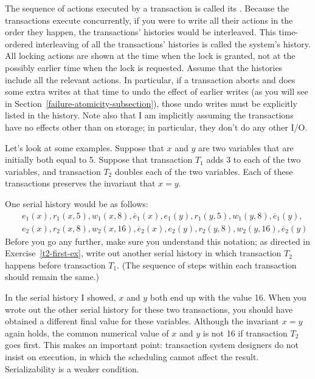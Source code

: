 The sequence of actions executed by a transaction is called its
.
Because the transactions execute concurrently, if you were to write
all their actions in the order they happen, the transactions'
histories would be interleaved.
This time-ordered interleaving of all the
transactions' histories is called the system's history.  All locking actions
are shown at the time when the lock is granted, not at the possibly
earlier time when the lock is requested.  Assume that the histories
include all the relevant actions.  In particular, if a transaction
aborts and does some extra writes at that time to undo the effect of
earlier writes (as you will see in Section~\ref{failure-atomicity-subsection}),
those undo writes must be explicitly listed in the history.  Note
also that I am implicitly assuming the transactions have no effects
other than on storage; in particular, they don't do any other I/O.

Let's look at some examples.  Suppose that $x$ and $y$ are two
variables that are initially both equal to 5.
Suppose that transaction $T_1$ adds 3 to each of the two
variables, and transaction $T_2$ doubles each of the two variables.
Each of these transactions preserves the invariant that
$x=y$.

One serial history would be as follows:
\begin{eqnarray*}
&&e_1(x), r_1(x, 5), w_1(x, 8), \overline{e}_1(x),
  e_1(y), r_1(y, 5), w_1(y, 8), \overline{e}_1(y),\\
&&e_2(x), r_2(x, 8), w_2(x, 16), \overline{e}_2(x),
  e_2(y), r_2(y, 8), w_2(y, 16), \overline{e}_2(y)
\end{eqnarray*}
Before you go any further, make sure you understand this notation; as directed in
Exercise~\ref{t2-first-ex}, write out another serial history in which transaction
$T_2$ happens before transaction $T_1$.  (The sequence of steps within each
transaction should remain the same.)

In the serial history I showed, $x$ and $y$ both end up with the value
16.  When you wrote out the other serial history for these two transactions,
you should have obtained a different final value for these variables.  Although
the invariant $x=y$ again holds, the common numerical value of $x$ and
$y$ is not 16 if transaction $T_2$ goes first.  This makes an important
point: transaction system designers do not insist on  execution,
in which the scheduling cannot affect the result.  Serializability is a
weaker condition.

